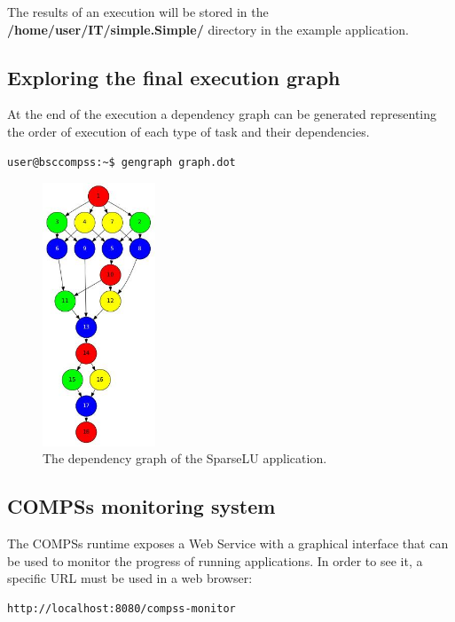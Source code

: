 The results of an execution will be stored in the {\bf /home/user/IT/simple.Simple/} directory in the example application.


\subsection{Exploring the final execution graph}
At the end of the execution a dependency graph can be generated representing the order of execution of each type of 
task and their dependencies.

\begin{lstlisting}[language=bash]
user@bsccompss:~$ gengraph graph.dot
\end{lstlisting}

\begin{figure}[h!]
  \centering
    \includegraphics[width=0.3\textwidth]{./Sections/3_Running_Apps/Figures/dependency_graph.jpeg}
    \caption{The dependency graph of the SparseLU application. \label{fig:dependency_graph}}
\end{figure}

\subsection{COMPSs monitoring system}
The COMPSs runtime exposes a Web Service with a graphical interface that can be used to monitor the progress of running 
applications. In order to see it, a specific URL must be used in a web browser:

\begin{lstlisting}[language=bash]
http://localhost:8080/compss-monitor
\end{lstlisting}

